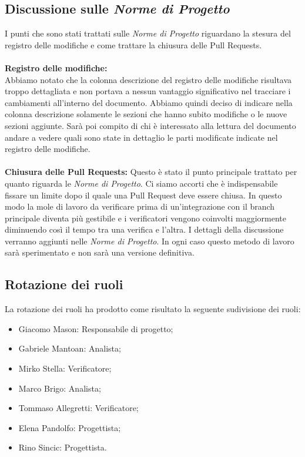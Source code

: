 \subsection{Discussione sulle \textit{Norme di Progetto}}
 I punti che sono stati trattati sulle \textit{Norme di Progetto} riguardano la stesura del registro delle modifiche e come trattare la chiusura delle Pull Requests.
\\\\
\textbf{Registro delle modifiche:}
\\
Abbiamo notato che la colonna descrizione del registro delle modifiche risultava troppo dettagliata e non portava a nessun vantaggio significativo nel tracciare i cambiamenti all'interno del documento.
Abbiamo quindi deciso di indicare nella colonna descrizione solamente le sezioni che hanno subito modifiche o le nuove sezioni aggiunte.
Sarà poi compito di chi è interessato alla lettura del documento andare a vedere quali sono state in dettaglio le parti modificate indicate nel registro delle modifiche.
\\\\
\textbf{Chiusura delle Pull Requests:}
Questo è stato il punto principale trattato per quanto riguarda le \textit{Norme di Progetto}.
Ci siamo accorti che è indispensabile fissare un limite dopo il quale una Pull Request deve essere chiusa.
In questo modo la mole di lavoro da verificare prima di un'integrazione con il branch principale diventa più gestibile e i verificatori vengono coinvolti maggiormente
diminuendo così il tempo tra una verifica e l'altra.
I dettagli della discussione verranno aggiunti nelle \textit{Norme di Progetto}. In ogni caso questo metodo di lavoro sarà sperimentato e non sarà una versione definitiva.
\\
\subsection{Rotazione dei ruoli}
La rotazione dei ruoli ha prodotto come risultato la seguente sudivisione dei ruoli:
\begin{itemize}
    \item Giacomo Mason: Responsabile di progetto;
	\item Gabriele Mantoan: Analista;
	\item Mirko Stella: Verificatore;
	\item Marco Brigo: Analista;
	\item Tommaso Allegretti: Verificatore;
	\item Elena Pandolfo: Progettista;
	\item Rino Sincic: Progettista.
\end{itemize}
